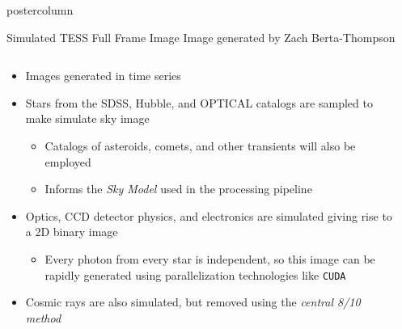 \documentclass[final,hyperref={pdfpagelabels=false}]{beamer}
\newlength{\columnheight}
\begin{document}
\begin{frame}
\begin{columns}
    \begin{column}{.49\textwidth}
      \begin{beamercolorbox}[center,wd=\textwidth]{postercolumn}
        \begin{minipage}[T]{.95\textwidth}
          \parbox[t][\columnheight]{\textwidth}{
            \begin{block}{Simulated TESS Full Frame Image}
            Image generated by Zach Berta-Thompson
              \begin{columns}
                \begin{column}{.60\textwidth}
                \begin{itemize}
                    \item Images generated in time series
                    \item Stars from the SDSS, Hubble, and OPTICAL catalogs are sampled to make simulate sky image
                    \begin{itemize}
                    	\item Catalogs of asteroids, comets, and other transients will also be employed
			\item Informs the \emph{Sky Model} used in the processing pipeline
                    \end{itemize}
                    \vfill
                    \item Optics, CCD detector physics, and electronics are simulated giving rise to a 2D binary image
                    \begin{itemize}
                    	\item Every photon from every star is independent, so this image can be rapidly generated using parallelization technologies like \texttt{CUDA} 
                    \end{itemize}
                    \vfill
                    \item Cosmic rays are also simulated, but removed using the \emph{central 8/10 method}
                    \vfill
                \end{itemize}
                \end{column}
                \begin{column}{.38\textwidth}

\end{column}
\end{columns}
\end{block}}
\end{minipage}
\end{beamercolorbox}
\end{column}
\end{columns}
\end{frame}
\end{document}
